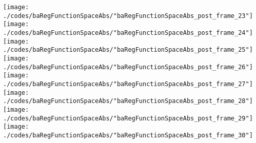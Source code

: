 \begin{frame}{\insertsection}
\begin{center}
{\begin{animateinline}{20}
				 \texttt{[image: ./codes/baRegFunctionSpaceAbs/"baRegFunctionSpaceAbs\_post\_frame\_23"]}\newframe
				 \texttt{[image: ./codes/baRegFunctionSpaceAbs/"baRegFunctionSpaceAbs\_post\_frame\_24"]}\newframe
				 \texttt{[image: ./codes/baRegFunctionSpaceAbs/"baRegFunctionSpaceAbs\_post\_frame\_25"]}\newframe
				 \texttt{[image: ./codes/baRegFunctionSpaceAbs/"baRegFunctionSpaceAbs\_post\_frame\_26"]}\newframe
				 \texttt{[image: ./codes/baRegFunctionSpaceAbs/"baRegFunctionSpaceAbs\_post\_frame\_27"]}\newframe
				 \texttt{[image: ./codes/baRegFunctionSpaceAbs/"baRegFunctionSpaceAbs\_post\_frame\_28"]}\newframe
				 \texttt{[image: ./codes/baRegFunctionSpaceAbs/"baRegFunctionSpaceAbs\_post\_frame\_29"]}\newframe
				 \texttt{[image: ./codes/baRegFunctionSpaceAbs/"baRegFunctionSpaceAbs\_post\_frame\_30"]}
			 \end{animateinline}
			}
	\end{center}
    
\end{frame}


